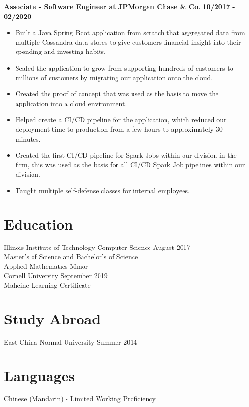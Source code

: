 \documentclass{res}
\begin{document}
\begin{resume}
	\textbf{Associate - Software Engineer at JPMorgan Chase \& Co.}
	\hfill{\bf 10/2017 - 02/2020}
	\begin{itemize}
		\item Built a Java Spring Boot application from scratch that aggregated data from multiple Cassandra data stores 
to give customers financial insight into their spending and investing habits.
		\item Scaled the application to grow from supporting hundreds of customers to millions of customers by migrating our application onto the cloud.
		\item Created the proof of concept that was used as the basis to move the application into a cloud environment.
		\item Helped create a CI/CD pipeline for the application, which reduced our deployment time to production from a few hours to approximately 30 minutes.
		\item Created the first CI/CD pipeline for Spark Jobs within our division in the firm, this was used as the basis for all CI/CD Spark Job pipelines within our division.
		\item Taught multiple self-defense classes for internal employees.
	\end{itemize}

	\section{\large{Education}}
	Illinois Institute of Technology \hfill
	{\centering Computer Science} 
	 \hfill August 2017 \\
	Master's of Science and Bachelor's of Science \\
	Applied Mathematics Minor \\
	\newline
	\newline
	Cornell University \hfill September 2019 \\
	Mahcine Learning Certificate
	
	\section{\large{Study Abroad}}
	East China Normal University \hfill Summer 2014  
	
	\section{\large{Languages}}
	Chinese (Mandarin) - Limited Working Proficiency
\end{resume}
\end{document}
